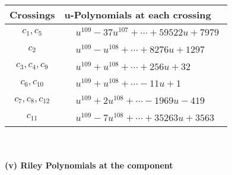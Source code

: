 \documentclass[1p]{elsarticle_modified}
\theoremstyle{definition}
\begin{document}
\begin{tabular}{m{50pt}|m{274pt}}
Crossings & \hspace{64pt}u-Polynomials at each crossing \\
\hline $$\begin{aligned}c_{1},c_{5}\end{aligned}$$&$\begin{aligned}
&u^{109}-37 u^{107}+\cdots+59522 u+7979
\end{aligned}$\\
\hline $$\begin{aligned}c_{2}\end{aligned}$$&$\begin{aligned}
&u^{109}- u^{108}+\cdots+8276 u+1297
\end{aligned}$\\
\hline $$\begin{aligned}c_{3},c_{4},c_{9}\end{aligned}$$&$\begin{aligned}
&u^{109}+u^{108}+\cdots+256 u+32
\end{aligned}$\\
\hline $$\begin{aligned}c_{6},c_{10}\end{aligned}$$&$\begin{aligned}
&u^{109}+u^{108}+\cdots-11 u+1
\end{aligned}$\\
\hline $$\begin{aligned}c_{7},c_{8},c_{12}\end{aligned}$$&$\begin{aligned}
&u^{109}+2 u^{108}+\cdots-1969 u-419
\end{aligned}$\\
\hline $$\begin{aligned}c_{11}\end{aligned}$$&$\begin{aligned}
&u^{109}-7 u^{108}+\cdots+35263 u+3563
\end{aligned}$\\
\hline
\end{tabular}\\~\\
\newpage\renewcommand{\arraystretch}{1}
\flushleft \textbf{(v) Riley Polynomials at the component}\newline \\
\end{document}
